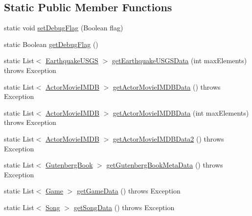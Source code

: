 \subsection*{Static Public Member Functions}
\begin{DoxyCompactItemize}
\item 
static void \hyperlink{classbridges_1_1connect_1_1_bridges_a9295b15aa880aa976706ed4f3337fb3b}{set\+Debug\+Flag} (Boolean flag)
\item 
static Boolean \hyperlink{classbridges_1_1connect_1_1_bridges_a5c9fa0dd62084bfd916c8bdecee3f517}{get\+Debug\+Flag} ()
\item 
static List$<$ \hyperlink{classbridges_1_1data__src__dependent_1_1_earthquake_u_s_g_s}{Earthquake\+U\+S\+G\+S} $>$ \hyperlink{classbridges_1_1connect_1_1_bridges_a58bef23cd12872c6ae5d7358b7485a2b}{get\+Earthquake\+U\+S\+G\+S\+Data} (int max\+Elements)  throws Exception 
\item 
static List$<$ \hyperlink{classbridges_1_1data__src__dependent_1_1_actor_movie_i_m_d_b}{Actor\+Movie\+I\+M\+D\+B} $>$ \hyperlink{classbridges_1_1connect_1_1_bridges_af35f7a4548f1aec8f208a56e1c74b5aa}{get\+Actor\+Movie\+I\+M\+D\+B\+Data} ()  throws Exception 
\item 
static List$<$ \hyperlink{classbridges_1_1data__src__dependent_1_1_actor_movie_i_m_d_b}{Actor\+Movie\+I\+M\+D\+B} $>$ \hyperlink{classbridges_1_1connect_1_1_bridges_a76280ef69f0205e3711b18617e5c7646}{get\+Actor\+Movie\+I\+M\+D\+B\+Data} (int max\+Elements)  throws Exception 
\item 
static List$<$ \hyperlink{classbridges_1_1data__src__dependent_1_1_actor_movie_i_m_d_b}{Actor\+Movie\+I\+M\+D\+B} $>$ \hyperlink{classbridges_1_1connect_1_1_bridges_a7a5f5efc6712ead5babe4cd21a4de3cc}{get\+Actor\+Movie\+I\+M\+D\+B\+Data2} ()  throws Exception 
\item 
static List$<$ \hyperlink{classbridges_1_1data__src__dependent_1_1_gutenberg_book}{Gutenberg\+Book} $>$ \hyperlink{classbridges_1_1connect_1_1_bridges_a7847b5a45cae8491acd5b6fb0015415b}{get\+Gutenberg\+Book\+Meta\+Data} ()  throws Exception 
\item 
static List$<$ \hyperlink{classbridges_1_1data__src__dependent_1_1_game}{Game} $>$ \hyperlink{classbridges_1_1connect_1_1_bridges_a594808b9dada5c825ac00ae0c97c9e9b}{get\+Game\+Data} ()  throws Exception 
\item 
static List$<$ \hyperlink{classbridges_1_1data__src__dependent_1_1_song}{Song} $>$ \hyperlink{classbridges_1_1connect_1_1_bridges_a5bcfed7f065d3c9da31e3551bf31ec7c}{get\+Song\+Data} ()  throws Exception 

\end{DoxyCompactItemize}
